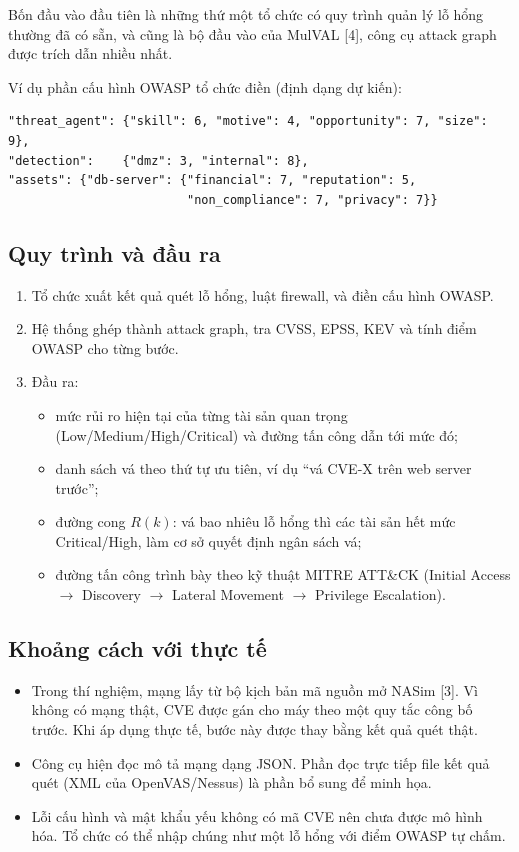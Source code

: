 \documentclass[11pt,a4paper]{article}
\begin{document}
Bốn đầu vào đầu tiên là những thứ một tổ chức có quy trình quản lý lỗ hổng thường đã có sẵn, và cũng là bộ đầu vào của MulVAL [4], công cụ attack graph được trích dẫn nhiều nhất.

Ví dụ phần cấu hình OWASP tổ chức điền (định dạng dự kiến):
\begin{small}
\begin{verbatim}
"threat_agent": {"skill": 6, "motive": 4, "opportunity": 7, "size": 9},
"detection":    {"dmz": 3, "internal": 8},
"assets": {"db-server": {"financial": 7, "reputation": 5,
                         "non_compliance": 7, "privacy": 7}}
\end{verbatim}
\end{small}

\subsection{Quy trình và đầu ra}

\begin{enumerate}
  \item Tổ chức xuất kết quả quét lỗ hổng, luật firewall, và điền cấu hình OWASP.
  \item Hệ thống ghép thành attack graph, tra CVSS, EPSS, KEV và tính điểm OWASP cho từng bước.
  \item Đầu ra:
  \begin{itemize}
    \item mức rủi ro hiện tại của từng tài sản quan trọng (Low/Medium/High/Critical) và đường tấn công dẫn tới mức đó;
    \item danh sách vá theo thứ tự ưu tiên, ví dụ ``vá CVE-X trên web server trước'';
    \item đường cong $R(k)$: vá bao nhiêu lỗ hổng thì các tài sản hết mức Critical/High, làm cơ sở quyết định ngân sách vá;
    \item đường tấn công trình bày theo kỹ thuật MITRE ATT\&CK (Initial Access $\to$ Discovery $\to$ Lateral Movement $\to$ Privilege Escalation).
  \end{itemize}
\end{enumerate}

\subsection{Khoảng cách với thực tế}

\begin{itemize}
  \item Trong thí nghiệm, mạng lấy từ bộ kịch bản mã nguồn mở NASim [3]. Vì không có mạng thật, CVE được gán cho máy theo một quy tắc công bố trước. Khi áp dụng thực tế, bước này được thay bằng kết quả quét thật.
  \item Công cụ hiện đọc mô tả mạng dạng JSON. Phần đọc trực tiếp file kết quả quét (XML của OpenVAS/Nessus) là phần bổ sung để minh họa.
  \item Lỗi cấu hình và mật khẩu yếu không có mã CVE nên chưa được mô hình hóa. Tổ chức có thể nhập chúng như một lỗ hổng với điểm OWASP tự chấm.
\end{itemize}
\end{document}
